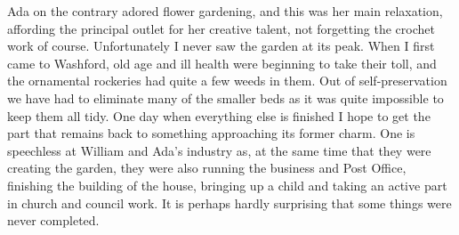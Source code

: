 Ada on the contrary adored flower gardening, and this was her main relaxation, affording the principal outlet for her creative talent, not forgetting the crochet work of course. Unfortunately I never saw the garden at its peak. When I first came to Washford, old age and ill health were beginning to take their toll, and the ornamental rockeries had quite a few weeds in them. Out of self-preservation we have had to eliminate many of the smaller beds as it was quite impossible to keep them all tidy. One day when everything else is finished I hope to get the part that remains back to something approaching its former charm. One is speechless at William and Ada's industry as, at the same time that they were creating the garden, they were also running the business and Post Office, finishing the building of the house, bringing up a child and taking an active part in church and council work. It is perhaps hardly surprising that some things were never completed.
 
\Flourish	 

